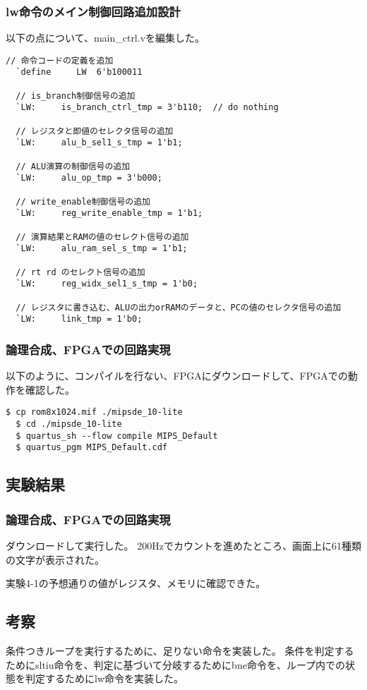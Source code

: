 \subsubsection{lw命令のメイン制御回路追加設計}
以下の点について、main\_ctrl.vを編集した。
\begin{lstlisting}[caption={lw命令の追加設計},label={lw命令の追加設計}]
  // 命令コードの定義を追加
  `define     LW  6'b100011

  // is_branch制御信号の追加
  `LW:     is_branch_ctrl_tmp = 3'b110;  // do nothing
  
  // レジスタと即値のセレクタ信号の追加
  `LW:     alu_b_sel1_s_tmp = 1'b1;

  // ALU演算の制御信号の追加
  `LW:     alu_op_tmp = 3'b000;

  // write_enable制御信号の追加
  `LW:     reg_write_enable_tmp = 1'b1;

  // 演算結果とRAMの値のセレクト信号の追加
  `LW:     alu_ram_sel_s_tmp = 1'b1;

  // rt rd のセレクト信号の追加
  `LW:     reg_widx_sel1_s_tmp = 1'b0;

  // レジスタに書き込む、ALUの出力orRAMのデータと、PCの値のセレクタ信号の追加
  `LW:     link_tmp = 1'b0;
\end{lstlisting}

\subsubsection{論理合成、FPGAでの回路実現}
以下のように、コンパイルを行ない、FPGAにダウンロードして、FPGAでの動作を確認した。

\begin{lstlisting}[caption={コンパイル、ダウンロード},label={コンパイル、ダウンロード4-2}]
  $ cp rom8x1024.mif ./mipsde_10-lite
  $ cd ./mipsde_10-lite
  $ quartus_sh --flow compile MIPS_Default
  $ quartus_pgm MIPS_Default.cdf 
\end{lstlisting}  

\subsection{実験結果}
\subsubsection{論理合成、FPGAでの回路実現}
ダウンロードして実行した。
200Hzでカウントを進めたところ、画面上に61種類の文字が表示された。

実験4-1の予想通りの値がレジスタ、メモリに確認できた。

\subsection{考察}
条件つきループを実行するために、足りない命令を実装した。
条件を判定するためにsltiu命令を、判定に基づいて分岐するためにbne命令を、ループ内での状態を判定するためにlw命令を実装した。
